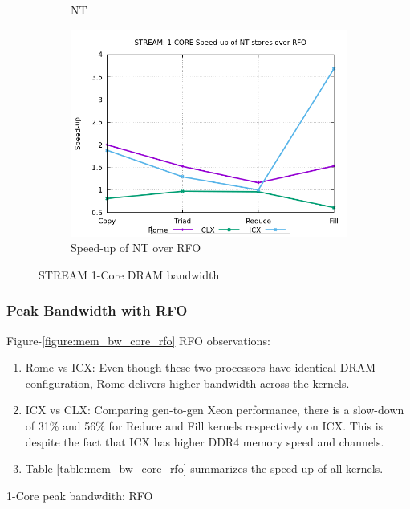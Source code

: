 \documentclass{article}
\begin{document}
\begin{figure}[!hb]
\begin{subfigure}[!hb]{0.3\textwidth}
         \caption{NT}
         \label{figure:mem_bw_core_nt}
    \end{subfigure}
    \begin{subfigure}[!hb]{0.3\textwidth}
         \centering
         \includegraphics[width=\textwidth]{../mem_bw_core/mb_core_nt_rfo}
         \caption{Speed-up of NT over RFO}
         \label{figure:mem_bw_core_nt_rfo}
    \end{subfigure}

    \caption{STREAM 1-Core DRAM bandwidth}
    \label{figure:mem_bw_core}
\end{figure}

\subsubsection{Peak Bandwidth with RFO}
Figure-\ref{figure:mem_bw_core_rfo} RFO observations:
\begin{enumerate}
\item Rome vs ICX: Even though these two processors have identical DRAM configuration, Rome delivers higher bandwidth across the kernels. 
\item ICX vs CLX: Comparing gen-to-gen Xeon performance, there is a slow-down of 31\% and 56\% for Reduce and Fill kernels respectively on ICX. This is despite the fact that ICX has higher DDR4 memory speed and channels.
\item Table-\ref{table:mem_bw_core_rfo} summarizes the speed-up of all kernels.
\end{enumerate}

\begin{table}[h!]
\centering

\caption{1-Core peak bandwdith: RFO}
\label{table:mem_bw_core_rfo}
\end{table}
\end{document}
